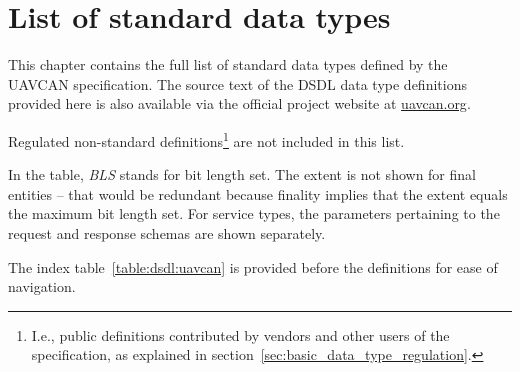 \chapter{List of standard data types}\label{sec:sdt}

This chapter contains the full list of standard data types defined by the UAVCAN specification.
The source text of the DSDL data type definitions provided here is also available via the
official project website at \href{http://uavcan.org}{uavcan.org}.

Regulated non-standard definitions\footnote{%
    I.e., public definitions contributed by vendors and other users
    of the specification, as explained in section~\ref{sec:basic_data_type_regulation}.
} are not included in this list.

In the table, \emph{BLS} stands for bit length set.
The extent is not shown for final entities -- that would be redundant because finality implies
that the extent equals the maximum bit length set.
For service types, the parameters pertaining to the request and response schemas are shown separately.

The index table~\ref{table:dsdl:uavcan} is provided before the definitions for ease of navigation.

\clearpage{}
